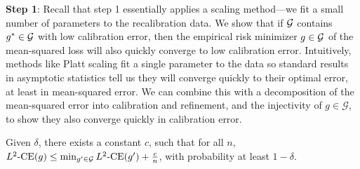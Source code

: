 \textbf{Step 1}: Recall that step 1 essentially applies a scaling method---we fit a small number of parameters to the recalibration data.
We show that if $\mathcal{G}{}$ contains $g^* \in \mathcal{G}{}$ with low calibration error, then the empirical risk minimizer $g \in \mathcal{G}{}$ of the mean-squared loss will also quickly converge to low calibration error.
Intuitively, methods like Platt scaling fit a single parameter to the data so standard results in asymptotic statistics tell us they will converge quickly to their optimal error, at least in mean-squared error.
We can combine this with a decomposition of the mean-squared error into calibration and refinement, and the injectivity of $g \in \mathcal{G}$, to show they also converge quickly in calibration error.

\begin{lemma}
\label{lem:platt_scaling_bound}
Given $\delta$, there exists a constant $c$, such that for all $n$, $L^2\textup{-CE}(g) \leq \min_{g' \in \mathcal{G}{}}L^2\textup{-CE}(g') + \frac{c}{n}$, with probability at least $1 - \delta$.
\end{lemma}

